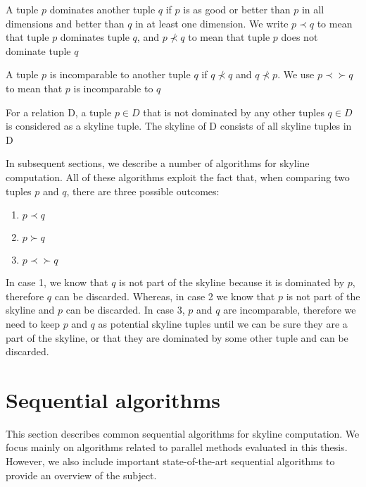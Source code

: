 \documentclass[12pt,a4paper,twoside]{report}
\begin{document}
\begin{definition}
	\label{def:dominance}
	A tuple $p$ dominates another tuple $q$ if $p$ is as good or better
	than $p$ in all dimensions and better than $q$ in at least one
	dimension.  We write $p \prec q$ to mean that tuple $p$
	dominates tuple $q$, and $p \nprec q$ to mean that tuple $p$ does
	not dominate tuple $q$
\end{definition}

\begin{definition}
	\label{def:incomparable}
	A tuple $p$ is incomparable to another tuple $q$ if $q \nprec q$ and
	$q \nprec p$. We use $p \prec\succ q$ to mean that $p$ is
	incomparable to $q$
\end{definition}

\begin{definition}
	\label{def:skyline}
	For a relation D, a tuple $p \in D$ that is not dominated by
	any other tuples $q \in D$ is considered as a skyline tuple.
	The skyline of D consists of all skyline tuples in D
\end{definition}

In subsequent sections, we describe a number of algorithms for
skyline computation. All of these algorithms exploit the fact
that, when comparing two tuples $p$ and $q$, there are three
possible outcomes: 

\begin{enumerate}
	\item $p \prec q$
	\item $p \succ q$
	\item $p \prec\succ q$
\end{enumerate}

In case 1, we know that $q$ is not part of the skyline because it is
dominated by $p$, therefore $q$ can be discarded. Whereas, in case 2
we know that $p$ is not part of the skyline and $p$ can be discarded.
In case 3, $p$ and $q$ are incomparable, therefore we need to keep $p$
and $q$ as potential skyline tuples until we can be sure they are a
part of the skyline, or that they are dominated by some other tuple
and can be discarded.

\section{Sequential algorithms}
\label{sec:skyline-algorithms}

This section describes common sequential algorithms for skyline
computation. We focus mainly on algorithms related to parallel
methods evaluated in this thesis. However, we also include
important state-of-the-art sequential algorithms to provide an
overview of the subject.
\end{document}
